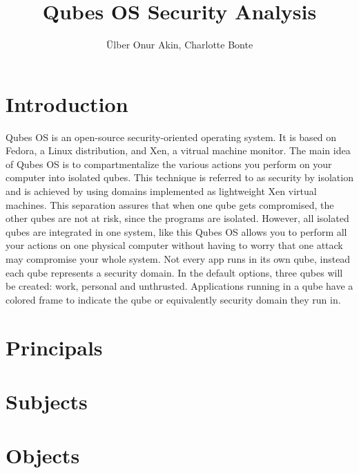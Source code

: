 \documentclass[runningheads,a4paper]{article}
\begin{document}
\title{Qubes OS Security Analysis}

\author{\"Ulber Onur Akin, Charlotte Bonte}

\maketitle

\tableofcontents

\newpage
\section{Introduction}
Qubes OS is an open-source security-oriented operating system. It is based on Fedora, a Linux distribution, and Xen, a vitrual machine monitor. The main idea of Qubes OS is to compartmentalize the various actions you perform on your computer into isolated qubes. This technique is referred to as security by isolation and is achieved by using domains implemented as lightweight Xen virtual machines. This separation assures that when one qube gets compromised, the other qubes are not at risk, since the programs are isolated. However, all isolated qubes are integrated in one system, like this Qubes OS allows you to perform all your actions on one physical computer without having to worry that one attack may compromise your whole system. Not every app runs in its own qube, instead each qube represents a security domain. In the default options, three qubes will be created: work, personal and unthrusted. Applications running in a qube have a colored frame to indicate the qube or equivalently security domain they run in.

\section{Principals}
\section{Subjects}
\section{Objects}
\end{document}
